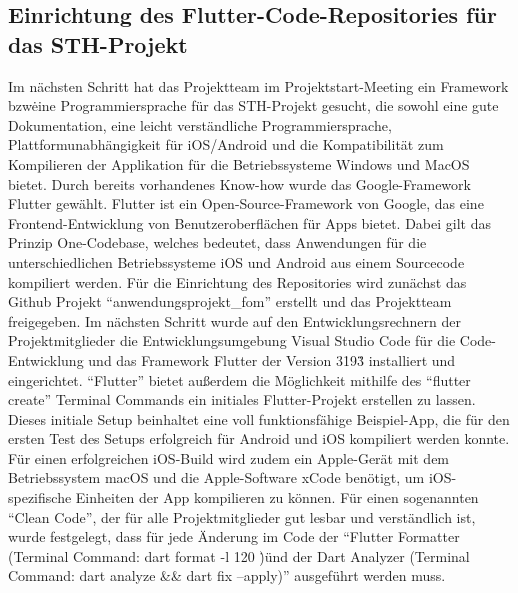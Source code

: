 \subsection{Einrichtung des Flutter-Code-Repositories für das STH-Projekt}
Im nächsten Schritt hat das Projektteam im Projektstart-Meeting ein Framework bzw\. eine Programmiersprache für das STH-Projekt gesucht, die sowohl eine gute Dokumentation, eine leicht verständliche Programmiersprache, Plattformunabhängigkeit für iOS/Android und die Kompatibilität zum Kompilieren der Applikation für die Betriebssysteme Windows und MacOS bietet.
Durch bereits vorhandenes Know-how wurde das Google-Framework Flutter gewählt.\newline
Flutter ist ein Open-Source-Framework von Google, das eine Frontend-Entwicklung von Benutzeroberflächen für Apps bietet.
Dabei gilt das Prinzip One-Codebase, welches bedeutet, dass Anwendungen für die unterschiedlichen Betriebssysteme iOS und Android aus einem Sourcecode kompiliert werden.
\newline
Für die Einrichtung des Repositories wird zunächst das Github Projekt ``anwendungsprojekt\_fom'' erstellt und das Projektteam freigegeben.
Im nächsten Schritt wurde auf den Entwicklungsrechnern der Projektmitglieder die Entwicklungsumgebung Visual Studio Code für die Code-Entwicklung und das Framework Flutter der Version 3\.19\.3 installiert und eingerichtet.
``Flutter'' bietet außerdem die Möglichkeit mithilfe des ``flutter create'' Terminal Commands ein initiales Flutter-Projekt erstellen zu lassen.
Dieses initiale Setup beinhaltet eine voll funktionsfähige Beispiel-App, die für den ersten Test des Setups erfolgreich für Android und iOS kompiliert werden konnte.
Für einen erfolgreichen iOS-Build wird zudem ein Apple-Gerät mit dem Betriebssystem macOS und die Apple-Software xCode benötigt, um iOS-spezifische Einheiten der App kompilieren zu können.
\newline
Für einen sogenannten ``Clean Code'', der für alle Projektmitglieder gut lesbar und verständlich ist, wurde festgelegt, dass für jede Änderung im Code der ``Flutter Formatter (Terminal Command: dart format -l 120 \.)\" und der Dart Analyzer (Terminal Command: dart analyze \&\& dart fix --apply)'' ausgeführt werden muss.
